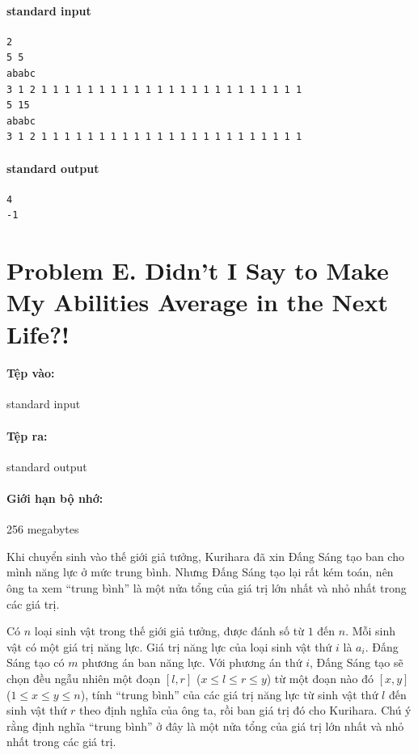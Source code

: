 \documentclass[11pt]{article}
\begin{document}
\paragraph{standard input}
\begin{verbatim}
2
5 5
ababc
3 1 2 1 1 1 1 1 1 1 1 1 1 1 1 1 1 1 1 1 1 1 1 1 1 1
5 15
ababc
3 1 2 1 1 1 1 1 1 1 1 1 1 1 1 1 1 1 1 1 1 1 1 1 1 1
\end{verbatim}

\paragraph{standard output}
\begin{verbatim}
4
-1
\end{verbatim}

\section{Problem E. Didn't I Say to Make My Abilities Average in the Next Life?!}

\paragraph{Tệp vào:} standard input
\paragraph{Tệp ra:} standard output
\paragraph{Giới hạn bộ nhớ:} 256 megabytes

Khi chuyển sinh vào thế giới giả tưởng, Kurihara đã xin Đấng Sáng tạo ban cho
mình năng lực ở mức trung bình. Nhưng Đấng Sáng tạo lại rất kém toán, nên
ông ta xem ``trung bình'' là một nửa tổng của giá trị lớn nhất và nhỏ nhất
trong các giá trị.

Có \(n\) loại sinh vật trong thế giới giả tưởng, được đánh số từ \(1\) đến
\(n\). Mỗi sinh vật có một giá trị năng lực. Giá trị năng lực của loại sinh
vật thứ \(i\) là \(a_i\). Đấng Sáng tạo có \(m\) phương án ban năng lực. Với
phương án thứ \(i\), Đấng Sáng tạo sẽ chọn đều ngẫu nhiên một đoạn \([l,r]\)
(\(x\le l\le r\le y\)) từ một đoạn nào đó \([x,y]\)
(\(1\le x\le y\le n\)), tính ``trung bình'' của các giá trị năng lực từ sinh
vật thứ \(l\) đến sinh vật thứ \(r\) theo định nghĩa của ông ta, rồi ban giá
trị đó cho Kurihara. Chú ý rằng định nghĩa ``trung bình'' ở đây là một nửa
tổng của giá trị lớn nhất và nhỏ nhất trong các giá trị.
\end{document}
